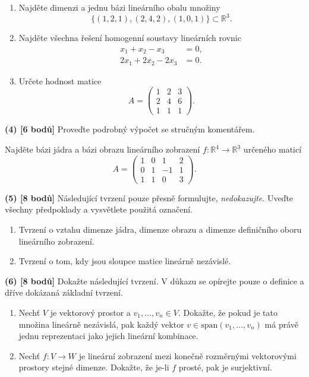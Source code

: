 \documentclass[12pt,a4paper]{article}
\begin{document}
\begin{enumerate}
\item Najděte dimenzi a jednu bázi lineárního obalu množiny
\[
\{(1,2,1),(2,4,2),(1,0,1)\}\subset \mathbb{R}^3.
\]

\item Najděte všechna řešení homogenní soustavy lineárních rovnic
\[
\begin{aligned}
x_1 + x_2 - x_3 &= 0,\\
2x_1 + 2x_2 - 2x_3 &= 0.
\end{aligned}
\]

\item Určete hodnost matice
\[
A=
\begin{pmatrix}
1 & 2 & 3\\
2 & 4 & 6\\
1 & 1 & 1
\end{pmatrix}.
\]
\end{enumerate}

\newpage

\textbf{(4) [6 bodů]} Proveďte podrobný výpočet se stručným komentářem.

Najděte bázi jádra a bázi obrazu lineárního zobrazení
$f\colon \mathbb{R}^4\to\mathbb{R}^3$
určeného maticí
\[
A=
\begin{pmatrix}
1 & 0 & 1 & 2\\
0 & 1 & -1 & 1\\
1 & 1 & 0 & 3
\end{pmatrix}.
\]

\newpage

\textbf{(5) [8 bodů]} Následující tvrzení pouze přesně formulujte, \emph{nedokazujte}.
Uveďte všechny předpoklady a vysvětlete použitá označení.

\begin{enumerate}
  \item Tvrzení o vztahu dimenze jádra, dimenze obrazu a dimenze definičního oboru lineárního zobrazení.
  \item Tvrzení o tom, kdy jsou sloupce matice lineárně nezávislé.
\end{enumerate}

\newpage

\textbf{(6) [8 bodů]} Dokažte následující tvrzení. V důkazu se opírejte pouze
o definice a dříve dokázaná základní tvrzení.

\begin{enumerate}
\item Nechť $V$ je vektorový prostor a $v_1,\dots,v_n\in V$.
Dokažte, že pokud je tato množina lineárně nezávislá, pak každý vektor
$v\in \mathrm{span}(v_1,\dots,v_n)$ má právě jednu reprezentaci jako jejich
lineární kombinace.

\item Nechť $f\colon V\to W$ je lineární zobrazení mezi konečně rozměrnými
vektorovými prostory stejné dimenze. Dokažte, že je-li $f$ prosté, pak je
surjektivní.
\end{enumerate}
\end{document}
